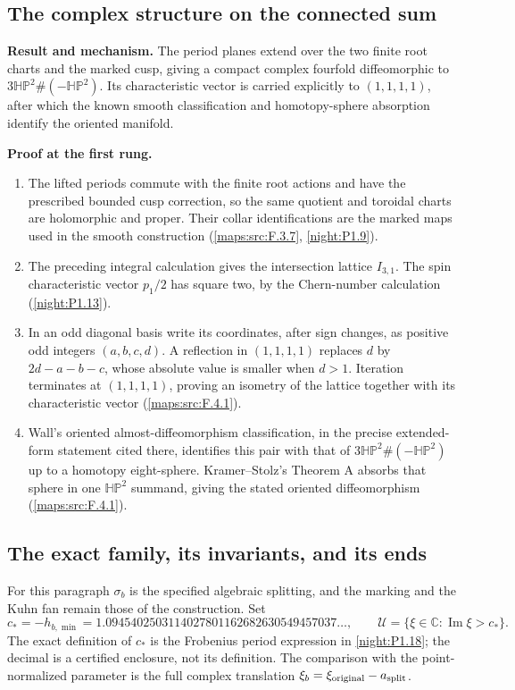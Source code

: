 \documentclass[11pt,a4paper]{article}
\theoremstyle{definition}
\newcommand{\RungZero}[1]{\par\noindent\textbf{Result and mechanism.} #1\par\smallskip}
\newcommand{\RungOne}{\par\Needspace{6\baselineskip}\noindent\textbf{Proof at the first rung.}\par\nobreak\smallskip}
\begin{document}
\subsection{The complex structure on the connected sum}
\RungZero{The period planes extend over the two finite root charts and
the marked cusp, giving a compact complex fourfold diffeomorphic to
$3\mathbb{HP}^2\#(-\mathbb{HP}^2)$.  Its characteristic vector is
carried explicitly to $(1,1,1,1)$, after which the known smooth
classification and homotopy-sphere absorption identify the oriented
manifold.}
\RungOne
\begin{enumerate}[label=\arabic*.]
\item The lifted periods commute with the finite root actions and
  have the prescribed bounded cusp correction, so the same quotient
  and toroidal charts are holomorphic and proper.  Their collar
  identifications are the marked maps used in the smooth construction
  (\cref{maps:src:F.3.7}, \cref{night:P1.9}).
\item The preceding integral calculation gives the intersection
  lattice $I_{3,1}$.  The spin characteristic vector $p_1/2$ has
  square two, by the Chern-number calculation
  (\cref{night:P1.13}).
\item In an odd diagonal basis write its coordinates, after sign
  changes, as positive odd integers $(a,b,c,d)$.  A reflection in
  $(1,1,1,1)$ replaces $d$ by $2d-a-b-c$, whose absolute value is
  smaller when $d>1$.  Iteration terminates at $(1,1,1,1)$, proving
  an isometry of the lattice together with its characteristic vector
  (\cref{maps:src:F.4.1}).
\item Wall's oriented almost-diffeomorphism classification, in the
  precise extended-form statement cited there, identifies this pair
  with that of $3\mathbb{HP}^2\#(-\mathbb{HP}^2)$ up to a homotopy
  eight-sphere.  Kramer--Stolz's Theorem A absorbs that sphere in one
  $\mathbb{HP}^2$ summand, giving the stated oriented diffeomorphism
  (\cref{maps:src:F.4.1}).
\end{enumerate}

\subsection{The exact family, its invariants, and its ends}
For this paragraph $\sigma_b$ is the specified algebraic splitting,
and the marking and the Kuhn fan remain those of the construction.
Set
\[
 c_*=-h_{b,\min}=1.0945402503114027801162682630549457037\ldots,
 \qquad \mathcal U=\{\xi\in\mathbb C:\operatorname{Im}\xi>c_*\}.
\]
The exact definition of $c_*$ is the Frobenius period expression in
\cref{night:P1.18}; the decimal is a certified enclosure, not its
definition.  The comparison with the point-normalized parameter is
the full complex translation $\xi_b=\xi_{\rm original}-a_{\rm split}$.
\end{document}
